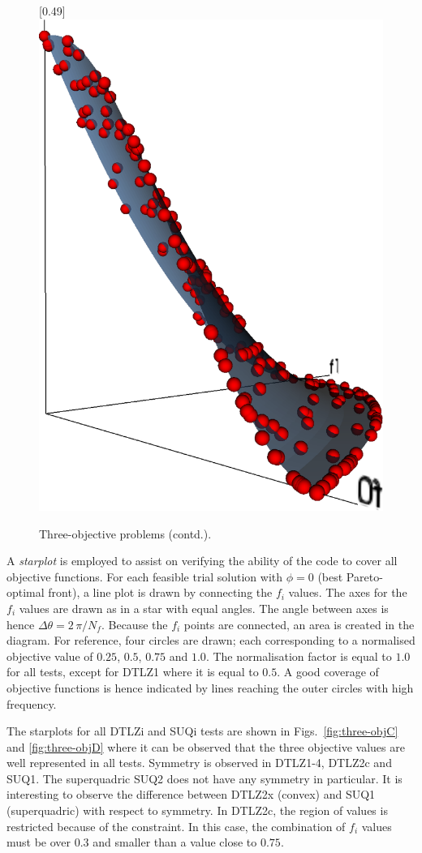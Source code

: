 \documentclass[final,5p,times,twocolumn]{elsarticle}
\newcommand{\fignames}{Figs.}
\begin{document}
\begin{figure}
[0.49\linewidth]{\includegraphics[width=0.26\linewidth]{./figs/res/vtk_SUQ2_B.eps}}
\caption{Three-objective problems (contd.).}%
\label{fig:three-objB}
\end{figure}


A \emph{starplot} is employed to assist on verifying the ability of the code to cover all objective
functions. For each feasible trial solution with $\phi=0$ (best Pareto-optimal front), a line plot
is drawn by connecting the $f_i$ values. The axes for the $f_i$ values are drawn as in a star with
equal angles. The angle between axes is hence $\Delta\theta = 2\,\pi / N_f$. Because the $f_i$
points are connected, an area is created in the diagram. For reference, four circles are drawn; each
corresponding to a normalised objective value of $0.25$, $0.5$, $0.75$ and $1.0$. The normalisation
factor is equal to $1.0$ for all tests, except for DTLZ1 where it is equal to $0.5$. A good coverage
of objective functions is hence indicated by lines reaching the outer circles with high frequency.

The starplots for all DTLZi and SUQi tests are shown in \fignames~\ref{fig:three-objC} and \ref{fig:three-objD} where it
can be observed that the three objective values are well represented in all tests. Symmetry is
observed in DTLZ1-4, DTLZ2c and SUQ1. The superquadric SUQ2 does not have any symmetry in
particular. It is interesting to observe the difference between DTLZ2x (convex) and SUQ1
(superquadric) with respect to symmetry. In DTLZ2c, the region of values is restricted because of
the constraint. In this case, the combination of $f_i$ values must be over $0.3$ and smaller than a
value close to $0.75$.
\end{document}
